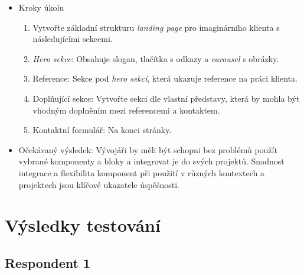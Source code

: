 \begin{enumerate}
\begin{itemize}
    \item Kroky úkolu
    \begin{enumerate}
      \item Vytvořte základní strukturu \emph{landing page} pro imaginárního klienta s následujícími sekcemi.
      \item \emph{Hero sekce}: Obsahuje slogan, tlačítka s odkazy a \emph{carousel} s obrázky.
      \item Reference: Sekce pod \emph{hero sekcí}, která ukazuje reference na práci klienta.
      \item Doplňující sekce: Vytvořte sekci dle vlastní představy, která by mohla být vhodným doplněním mezi referencemi a kontaktem.
      \item Kontaktní formulář: Na konci stránky.
    \end{enumerate}
    \item Očekávaný výsledek: Vývojáři by měli být schopni bez problémů použít vybrané komponenty a bloky a integrovat je do svých projektů. Snadnost integrace a flexibilita komponent při použití v různých kontextech a projektech jsou klíčové ukazatele úspěšnosti.
  \end{itemize}
\end{enumerate}

\section{Výsledky testování}

\subsection{Respondent 1}

